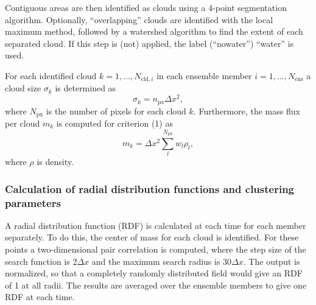 \documentclass[a4paper, 12pt]{article}
\begin{document}
Contiguous areas are then identified as clouds using a 4-point segmentation algorithm. Optionally, ``overlapping'' clouds are identified with the local maximum method, followed by a watershed algorithm to find the extent of each separated cloud. If this step is (not) applied, the label (``nowater'') ``water'' is used. 

For each identified cloud $k=1,...,N_{\mathrm{cld},i}$ in each ensemble member $i=1,...,N_{\mathrm{ens}}$ a cloud size $\sigma_k$ is determined as
\begin{equation} \label{eq:cld_size}
 \sigma_k = n_{px} \Delta x^2,
\end{equation}
where $N_{\mathrm{px}}$ is the number of pixels for each cloud $k$. Furthermore, the mass flux per cloud $m_k$ is computed for criterion (1) as
\begin{equation} \label{eq:mass_flux_per_cloud}
 m_k = \Delta x^2 \sum_{l}^{N_{\mathrm{px}}} w_l \rho_l,
\end{equation}
where $\rho$ is density.

\subsubsection{Calculation of radial distribution functions and clustering parameters}
A radial distribution function (RDF) is calculated at each time for each member separately. To do this, the center of mass for each cloud is identified. For these points a two-dimensional pair correlation is computed, where the step size of the search function is 2$\Delta x$ and the maximum search radius is 30$\Delta x$. The output is normalized, so that a completely randomly distributed field would give an RDF of 1 at all radii. The results are averaged over the ensemble members to give one RDF at each time. 

\end{document}
